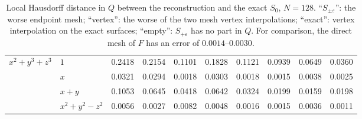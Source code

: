 \documentclass[12pt, a4paper]{article}
\theoremstyle{plain}
\theoremstyle{definition}
\theoremstyle{remark}
\theoremstyle{definition}
\begin{document}
\begin{table}[!ht]
\begin{adjustbox}{max width=\textwidth}
\begin{tabular}{l l c c c c c c c c}
\midrule
$x^2+y^3+z^3$ & $1$ & 0.2418 & 0.2154 & 0.1101 & 0.1828 & 0.1121 & 0.0939 & 0.0649 & 0.0360 \\
 & $x$ & 0.0321 & 0.0294 & 0.0018 & 0.0303 & 0.0018 & 0.0015 & 0.0038 & 0.0025 \\
 & $x+y$ & 0.1053 & 0.0645 & 0.0418 & 0.0642 & 0.0324 & 0.0199 & 0.0159 & 0.0198 \\
 & $x^2+y^2-z^2$ & 0.0056 & 0.0027 & 0.0082 & 0.0048 & 0.0016 & 0.0015 & 0.0036 & 0.0011 \\
\bottomrule
\end{tabular}
\end{adjustbox}
\caption[Interpolation: all pairs (1/2)]{Local Hausdorff distance in $Q$ between the reconstruction and the exact $S_0$, $N=128$. ``$S_{\pm\varepsilon}$'': the worse endpoint mesh; ``vertex'': the worse of the two mesh vertex interpolations; ``exact'': vertex interpolation on the exact surfaces; ``empty'': $S_{+\varepsilon}$ has no part in $Q$. For comparison, the direct mesh of $F$ has an error of $0.0014$--$0.0030$.}
\label{tab:interp-pairs-1}
\end{table}
\end{document}
